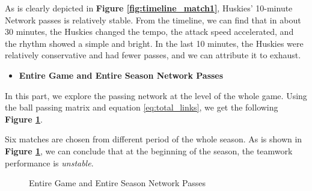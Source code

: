 \documentclass[12pt]{article}  %
\begin{document}
As is clearly depicted in \textbf{Figure \ref{fig:timeline_match1}}, Huskies' 10-minute Network passes is relatively stable. From the timeline, we can find that in about 30 minutes, the Huskies changed the tempo, the attack speed accelerated, and the rhythm showed a simple and bright. In the last 10 minutes, the Huskies were relatively conservative and had fewer passes, and we can attribute it to exhaust.


\vspace{4pt}
\begin{itemize}
    \item \textbf{Entire Game and Entire Season Network Passes}
\end{itemize}

In this part, we explore the passing network at the level of the whole game. Using the ball passing matrix and equation \eqref{eq:total_links}, we get the following \textbf{Figure \ref{Fig:total_links}}.



Six matches are chosen from different period of the whole season. As is shown in \textbf{Figure \ref{Fig:total_links}}, we can conclude that at the beginning of the season, the teamwork performance is \textit{unstable}. 


\begin{figure}[htbp]
    \centering    
    
    \caption{Entire Game and Entire Season Network Passes}		%
    \label{Fig:total_links}									%
\end{figure}
\end{document}
